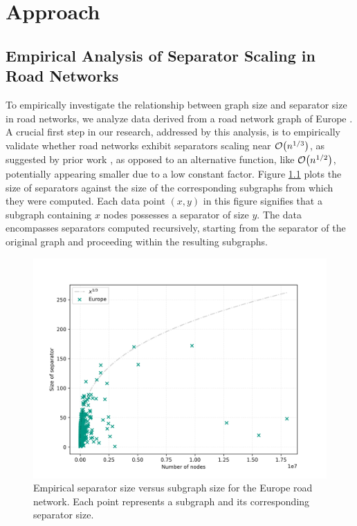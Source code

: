 \chapter{Approach}
\label{ch:experimental_analysis}


\section{Empirical Analysis of Separator Scaling in Road Networks}
\label{sec:empirical_analysis}

To empirically investigate the relationship between graph size and separator size in road networks, we analyze data derived from a road network graph of Europe \cite{ptv_group_ptv_nodate}.
A crucial first step in our research, addressed by this analysis, is to empirically validate whether road networks exhibit separators scaling near \(\mathcal{O}\!\left(n^{1/3}\right)\), as suggested by prior work \cite{dibbelt_customizable_2016}, as opposed to an alternative function, like \(\mathcal{O}\!\left(n^{1/2}\right)\), potentially appearing smaller due to a low constant factor.
Figure \cref{fig:separator_size_vs_graph_size} plots the size of separators against the size of the corresponding subgraphs from which they were computed.
Each data point \( (x, y) \) in this figure signifies that a subgraph containing \( x \) nodes possesses a separator of size \( y \).
The data encompasses separators computed recursively, starting from the separator of the original graph and proceeding within the resulting subgraphs.

\begin{figure}
	\centering
	\includegraphics[width=0.7\linewidth]{graphics/Europe.png}
	\caption{Empirical separator size versus subgraph size for the Europe road network. Each point represents a subgraph and its corresponding separator size.}
	\label{fig:separator_size_vs_graph_size}
\end{figure}

